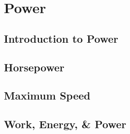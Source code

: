\documentclass[../alevelmaths.tex]{subfiles}
\begin{document}
\chapter{Power}
\section{Introduction to Power}
\section{Horsepower}
\section{Maximum Speed}
\section{Work, Energy, \& Power}
\end{document}
